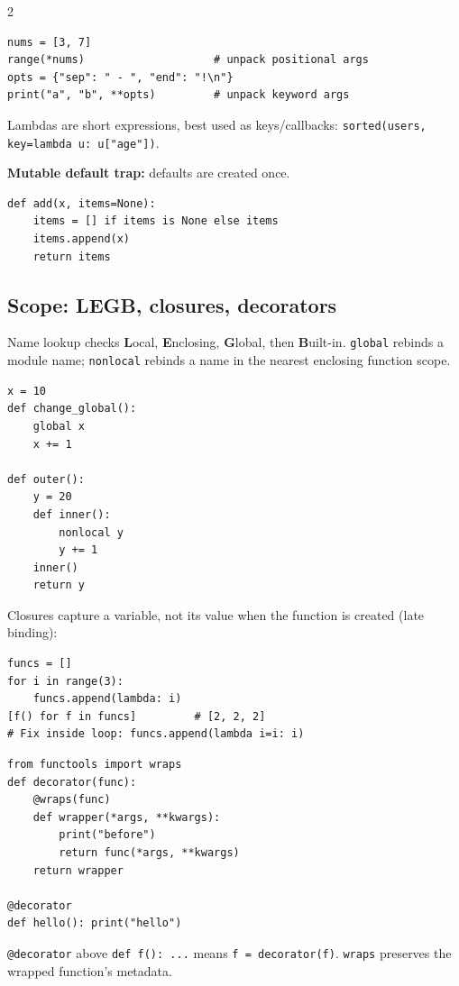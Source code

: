 \documentclass[10pt,a4paper]{article}
\newcommand{\py}[1]{\texttt{#1}}
\newcommand{\warn}[1]{\textcolor{Warn}{\bfseries #1}}
\begin{document}
\begin{multicols}{2}
\begin{lstlisting}
nums = [3, 7]
range(*nums)                    # unpack positional args
opts = {"sep": " - ", "end": "!\n"}
print("a", "b", **opts)         # unpack keyword args
\end{lstlisting}

Lambdas are short expressions, best used as keys/callbacks: \py{sorted(users, key=lambda u: u["age"])}.

\warn{Mutable default trap:} defaults are created once.

\begin{lstlisting}
def add(x, items=None):
    items = [] if items is None else items
    items.append(x)
    return items
\end{lstlisting}

\subsection{Scope: LEGB, closures, decorators}

Name lookup checks \textbf{L}ocal, \textbf{E}nclosing, \textbf{G}lobal, then \textbf{B}uilt-in. \py{global} rebinds a module name; \py{nonlocal} rebinds a name in the nearest enclosing function scope.

\begin{lstlisting}
x = 10
def change_global():
    global x
    x += 1

def outer():
    y = 20
    def inner():
        nonlocal y
        y += 1
    inner()
    return y
\end{lstlisting}

Closures capture a variable, not its value when the function is created (late binding):

\begin{lstlisting}
funcs = []
for i in range(3):
    funcs.append(lambda: i)
[f() for f in funcs]         # [2, 2, 2]
# Fix inside loop: funcs.append(lambda i=i: i)
\end{lstlisting}

\begin{lstlisting}
from functools import wraps
def decorator(func):
    @wraps(func)
    def wrapper(*args, **kwargs):
        print("before")
        return func(*args, **kwargs)
    return wrapper

@decorator
def hello(): print("hello")
\end{lstlisting}

\py{@decorator} above \py{def f(): ...} means \py{f = decorator(f)}. \py{wraps} preserves the wrapped function's metadata.


\end{multicols}
\end{document}
